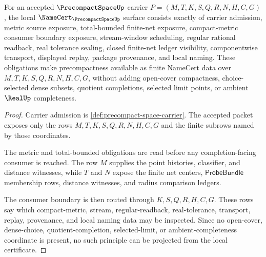 \begin{theorem}
\label{thm:precompact-space-namecert-obligations}
For an accepted $\PrecompactSpaceUp$ carrier $P=(M,T,K,S,Q,R,N,H,C,G)$, the local $\NameCert_{\PrecompactSpaceUp}$ surface consists exactly of carrier admission, metric source exposure, total-bounded finite-net exposure, compact-metric consumer boundary exposure, stream-window scheduling, regular rational readback, real tolerance sealing, closed finite-net ledger visibility, componentwise transport, displayed replay, package provenance, and local naming. These obligations make precompactness available as finite NameCert data over $M,T,K,S,Q,R,N,H,C,G$, without adding open-cover compactness, choice-selected dense subsets, quotient completions, selected limit points, or ambient $\RealUp$ completeness.
\end{theorem}
\begin{proof}
Carrier admission is \autoref{def:precompact-space-carrier}. The accepted packet exposes only the rows $M,T,K,S,Q,R,N,H,C,G$ and the finite subrows named by those coordinates.

The metric and total-bounded obligations are read before any completion-facing consumer is reached. The row $M$ supplies the point histories, classifier, and distance witnesses, while $T$ and $N$ expose the finite net centers, $\mathsf{ProbeBundle}$ membership rows, distance witnesses, and radius comparison ledgers.

The consumer boundary is then routed through $K,S,Q,R,H,C,G$. These rows say which compact-metric, stream, regular-readback, real-tolerance, transport, replay, provenance, and local naming data may be inspected. Since no open-cover, dense-choice, quotient-completion, selected-limit, or ambient-completeness coordinate is present, no such principle can be projected from the local certificate.
\end{proof}

